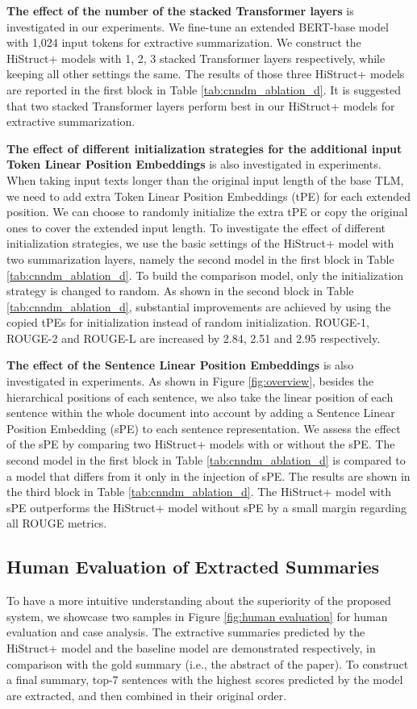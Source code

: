 \documentclass[11pt]{article}
\begin{document}
\textbf{The effect of the number of the stacked Transformer layers} is investigated in our experiments. 
We fine-tune an extended BERT-base model with 1,024 input tokens for extractive summarization. We construct the HiStruct+ models with 1, 2, 3 stacked Transformer layers respectively, while keeping all other settings the same.  The results of those three HiStruct+ models are reported in the first block in Table \ref{tab:cnndm_ablation_d}. It is suggested that two stacked Transformer layers perform best in our HiStruct+ models for extractive summarization.

\textbf{The effect of different initialization strategies for the additional input Token Linear Position Embeddings} is also investigated in experiments. When taking input texts longer than the original input length of the base TLM, we need to add extra Token Linear Position Embeddings (tPE) for each extended position. We can choose to randomly initialize the extra tPE or copy the original ones to cover the extended input length. To investigate the effect of different initialization strategies, we use the basic settings of the HiStruct+ model with two summarization layers, namely the second model in the first block in Table \ref{tab:cnndm_ablation_d}. To build the comparison model, only the initialization strategy is changed to random.  As shown in the second block in Table \ref{tab:cnndm_ablation_d}, substantial improvements are achieved by using the copied tPEs for initialization instead of random initialization. ROUGE-1, ROUGE-2 and ROUGE-L are increased by 2.84, 2.51 and 2.95 respectively. 

\textbf{The effect of the Sentence Linear Position Embeddings} is also investigated in experiments. As shown in Figure \ref{fig:overview}, besides the hierarchical positions of each sentence, we also take the linear position of each sentence within the whole document into account by adding a Sentence Linear Position Embedding (sPE) to each sentence representation.  We assess the effect of the sPE by comparing two HiStruct+ models with or without the sPE. The second model in the first block in Table \ref{tab:cnndm_ablation_d} is compared to a model that differs from it only in the injection of sPE. The results are shown in the third block in Table \ref{tab:cnndm_ablation_d}. The HiStruct+ model with sPE outperforms the HiStruct+ model without sPE by a small margin regarding all ROUGE metrics. 


\subsection{Human Evaluation of Extracted Summaries}
\label{subsec:human_evluation}
To have a more intuitive understanding about the superiority of the proposed system, we showcase two samples in Figure \ref{fig:human evaluation} for human evaluation and case analysis. The extractive summaries predicted by the HiStruct+ model and the baseline model are demonstrated respectively, in comparison with the gold summary (i.e., the abstract of the paper). To construct a final summary, top-7 sentences with the highest scores predicted by the model are extracted, and then combined in their original order.
\end{document}
